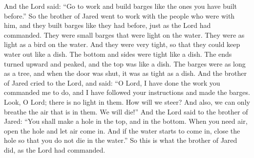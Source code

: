 And the Lord said: ``Go to work and build barges like the ones you have built before.'' So the brother of Jared went to work with the people who were with him, and they built barges like they had before, just as the Lord had commanded. They were small barges that were light on the water. They were as light as a bird on the water.
\bverse \iffalse And they were built after a manner that they were exceedingly tight, even that they would hold water like unto a dish; and the bottom thereof was tight like unto a dish; and the sides thereof were tight like unto a dish; and the ends thereof were peaked; and the top thereof was tight like unto a dish; and the length thereof was the length of a tree; and the door thereof, when it was shut, was tight like unto a dish. \fi
And they were very tight, so that they could keep water out like a dish. The bottom and sides were tight like a dish. The ends turned upward and peaked, and the top was like a dish. The barges were as long as a tree, and when the door was shut, it was as tight as a dish.
\bverse \iffalse And it came to pass that the brother of Jared cried unto the Lord, saying: O Lord, I have performed the work which thou hast commanded me, and I have made the barges according as thou hast directed me. \fi
And the brother of Jared cried to the Lord, and said: ``O Lord, I have done the work you commanded me to do, and I have followed your instructions and made the barges.
\bverse \iffalse And behold, O Lord, in them there is no light; whither shall we steer? And also we shall perish, for in them we cannot breathe, save it is the air which is in them; therefore we shall perish. \fi
Look, O Lord; there is no light in them. How will we steer? And also, we can only breathe the air that is in them. We will die!''
\bverse \iffalse And the Lord said unto the brother of Jared: Behold, thou shalt make a hole in the top, and also in the bottom; and when thou shalt suffer for air thou shalt unstop the hole and receive air. And if it be so that the water come in upon thee, behold, ye shall stop the hole, that ye may not perish in the flood. \fi
And the Lord said to the brother of Jared: ``You shall make a hole in the top, and in the bottom. When you need air, open the hole and let air come in. And if the water starts to come in, close the hole so that you do not die in the water.''
\bverse \iffalse And it came to pass that the brother of Jared did so, according as the Lord had commanded. \fi
So this is what the brother of Jared did, as the Lord had commanded.
